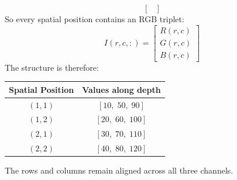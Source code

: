 \begin{examplebox}
\begin{equation*}
\begin{bmatrix}
        \end{bmatrix}
    \end{equation*}
    So every spatial position contains an RGB triplet:
    \begin{equation*}
        I(r, c, :) = \begin{bmatrix}
            R(r, c) \\
            G(r, c) \\
            B(r, c)
        \end{bmatrix}
    \end{equation*}
    The structure is therefore:
    \begin{center}
        \begin{tabular}{@{} c c @{}}
            \toprule
            \textbf{Spatial Position} & \textbf{Values along depth} \\
            \midrule
            $(1, 1)$ & $[10,\; 50,\; 90]$ \\
            $(1, 2)$ & $[20,\; 60,\; 100]$ \\
            $(2, 1)$ & $[30,\; 70,\; 110]$ \\
            $(2, 2)$ & $[40,\; 80,\; 120]$ \\
            \bottomrule
        \end{tabular}
    \end{center}
    The rows and columns remain aligned across all three channels.
\end{examplebox}

\hfill

